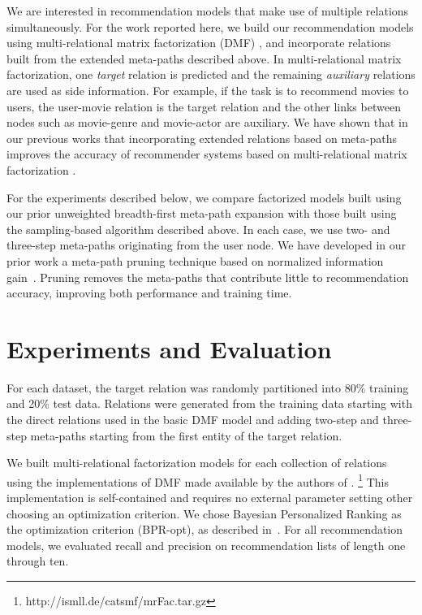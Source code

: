 \documentclass {acmart}
\begin{document}
We are interested in recommendation models that make use of multiple relations simultaneously. For the work reported here, we build our recommendation models using multi-relational matrix factorization (DMF) \cite{Drumond:2014:OMF:2661829.2662052,DBLP:conf/flairs/VahedianBM16}, and incorporate relations built from the extended meta-paths described above. In multi-relational matrix factorization, one \textit{target} relation is predicted and the remaining \textit{auxiliary} relations are used as side information. For example, if the task is to recommend movies to users, the user-movie relation is the target relation and the other links between nodes such as movie-genre and movie-actor are auxiliary. We have shown that in our previous works that incorporating extended relations based on meta-paths improves the accuracy of recommender systems based on multi-relational matrix factorization \cite{DBLP:conf/recsys/VahedianBM15,DBLP:conf/flairs/VahedianBM16}. 

For the experiments described below, we compare factorized models built using our prior unweighted breadth-first meta-path expansion with those built using the sampling-based algorithm described above. In each case, we use two- and three-step meta-paths originating from the user node. We have developed in our prior work a meta-path pruning technique based on normalized information gain~\cite{something}. Pruning removes the meta-paths that contribute little to recommendation accuracy, improving both performance and training time. 

\section{Experiments and Evaluation}
For each dataset, the target relation was randomly partitioned into 80\% training and 20\% test data. Relations were generated from the training data starting with the direct relations used in the basic DMF model and adding two-step and three-step meta-paths starting from the first entity of the target relation. 

We built multi-relational factorization models for each collection of relations using the implementations of DMF made available by the authors of \cite{Drumond:2014:OMF:2661829.2662052}. \footnote{http://ismll.de/catsmf/mrFac.tar.gz} This implementation is self-contained and requires no external parameter setting other choosing an optimization criterion. We chose Bayesian Personalized Ranking as the optimization criterion (BPR-opt), as described in~\cite{Drumond:2014:OMF:2661829.2662052}. For all recommendation models, we evaluated recall and precision on recommendation lists of length one through ten.
\end{document}

